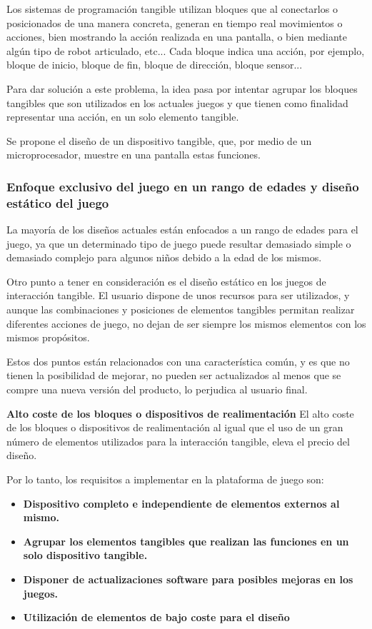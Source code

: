 Los sistemas de programación tangible utilizan bloques que al conectarlos o posicionados de una manera concreta, generan en tiempo real movimientos o acciones, bien mostrando la acción realizada en una pantalla, o bien mediante algún tipo de robot articulado, etc... Cada bloque indica una acción, por ejemplo, bloque de inicio, bloque de fin, bloque de dirección, bloque sensor... 

Para dar solución a este problema, la idea pasa por intentar agrupar los bloques tangibles que son utilizados en los actuales juegos y que tienen como finalidad representar una acción, en un solo elemento tangible.

Se propone el diseño de un dispositivo tangible, que, por medio de un microprocesador, muestre en una pantalla estas funciones. 


\subsubsection{Enfoque exclusivo del juego en un rango de edades y diseño estático del juego}

La mayoría de los diseños actuales están enfocados a un rango de edades para el juego, ya que un determinado tipo de juego puede resultar demasiado simple o demasiado complejo para algunos niños debido a la edad de los mismos. 

Otro punto a tener en consideración es el diseño estático en los juegos de interacción tangible. El usuario dispone de unos recursos para ser utilizados, y aunque las combinaciones y posiciones de elementos tangibles permitan realizar diferentes acciones de juego, no dejan de ser siempre los mismos elementos con los mismos propósitos.

Estos dos puntos están relacionados con una característica común, y es que no tienen la posibilidad de mejorar, no pueden ser actualizados al menos que se compre una nueva versión del producto, lo perjudica al usuario final.

\textbf{Alto coste de los bloques o dispositivos de realimentación}
El alto coste de los bloques o dispositivos de realimentación al igual que el uso de un gran número de elementos utilizados para la interacción tangible, eleva el precio del
diseño.


Por lo tanto, los requisitos a implementar en la plataforma de juego son:
\begin{itemize}
\item \textbf{Dispositivo completo e independiente de elementos externos al mismo.}
\item \textbf{Agrupar los elementos tangibles que realizan las funciones en un solo dispositivo tangible.}
\item \textbf{Disponer de actualizaciones software para posibles mejoras en los juegos.}
\item \textbf{Utilización de elementos de bajo coste para el diseño }

\end{itemize}


